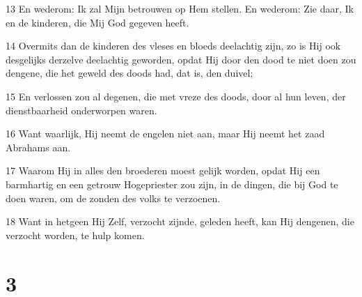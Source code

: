 \par 13 En wederom: Ik zal Mijn betrouwen op Hem stellen. En wederom: Zie daar, Ik en de kinderen, die Mij God gegeven heeft.
\par 14 Overmits dan de kinderen des vleses en bloeds deelachtig zijn, zo is Hij ook desgelijks derzelve deelachtig geworden, opdat Hij door den dood te niet doen zou dengene, die het geweld des doods had, dat is, den duivel;
\par 15 En verlossen zou al degenen, die met vreze des doods, door al hun leven, der dienstbaarheid onderworpen waren.
\par 16 Want waarlijk, Hij neemt de engelen niet aan, maar Hij neemt het zaad Abrahams aan.
\par 17 Waarom Hij in alles den broederen moest gelijk worden, opdat Hij een barmhartig en een getrouw Hogepriester zou zijn, in de dingen, die bij God te doen waren, om de zonden des volks te verzoenen.
\par 18 Want in hetgeen Hij Zelf, verzocht zijnde, geleden heeft, kan Hij dengenen, die verzocht worden, te hulp komen.

\chapter{3}


